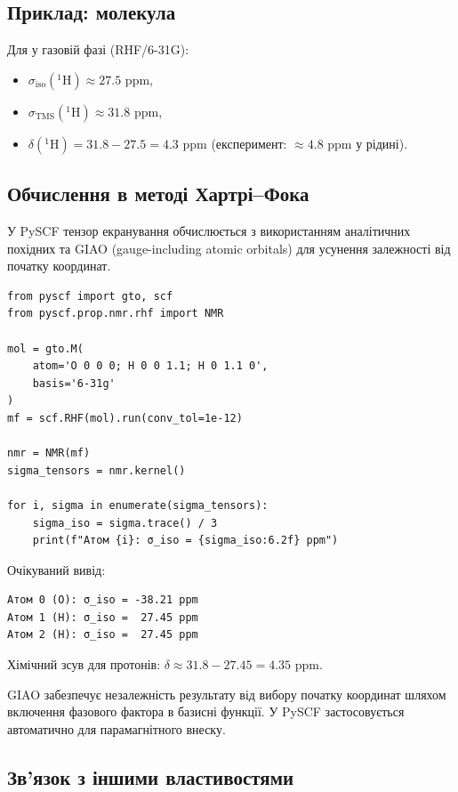 \subsection{Приклад: молекула }

Для  у газовій фазі (RHF/6-31G):
\begin{itemize}
	\item \(\sigma_{\text{iso}}(^1\text{H}) \approx 27.5\) ppm,
	\item \(\sigma_{\text{TMS}}(^1\text{H}) \approx 31.8\) ppm,
	\item \(\delta(^1\text{H}) = 31.8 - 27.5 = 4.3\) ppm (експеримент: \(\approx 4.8\) ppm у рідині).
\end{itemize}

\subsection{Обчислення в методі Хартрі--Фока}

У PySCF тензор екранування обчислюється з використанням аналітичних похідних та GIAO (gauge-including atomic orbitals) для усунення залежності від початку координат.

\begin{verbatim}
from pyscf import gto, scf
from pyscf.prop.nmr.rhf import NMR

mol = gto.M(
    atom='O 0 0 0; H 0 0 1.1; H 0 1.1 0',
    basis='6-31g'
)
mf = scf.RHF(mol).run(conv_tol=1e-12)

nmr = NMR(mf)
sigma_tensors = nmr.kernel()

for i, sigma in enumerate(sigma_tensors):
    sigma_iso = sigma.trace() / 3
    print(f"Атом {i}: σ_iso = {sigma_iso:6.2f} ppm")
\end{verbatim}

Очікуваний вивід:
\begin{verbatim}
Атом 0 (O): σ_iso = -38.21 ppm
Атом 1 (H): σ_iso =  27.45 ppm
Атом 2 (H): σ_iso =  27.45 ppm
\end{verbatim}

Хімічний зсув для протонів: \(\delta \approx 31.8 - 27.45 = 4.35\) ppm.

\begin{commentbox}
GIAO забезпечує незалежність результату від вибору початку координат шляхом включення фазового фактора в базисні функції. У PySCF застосовується автоматично для парамагнітного внеску.
\end{commentbox}

\subsection{Зв’язок з іншими властивостями}

